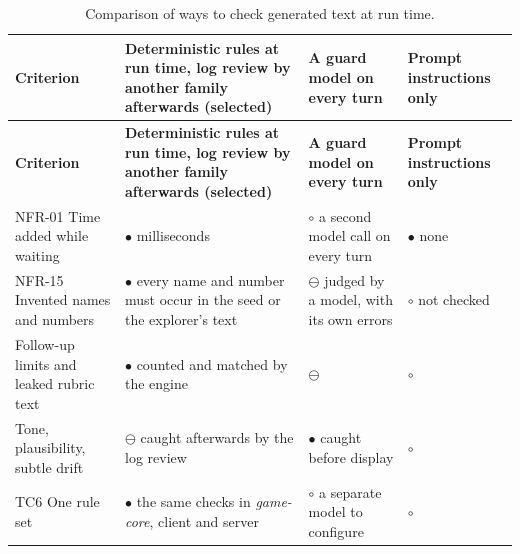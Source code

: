 {\small
\begin{longtable}{|>{\raggedright\arraybackslash}p{}|>{\raggedright\arraybackslash}p{}|>{\raggedright\arraybackslash}p{}|>{\raggedright\arraybackslash}p{}|}
\caption{Comparison of ways to check generated text at run time.} \\
\hline
\textbf{Criterion} & \textbf{Deterministic rules at run time, log review by another family afterwards (selected)} & \textbf{A guard model on every turn\cite{r199}} & \textbf{Prompt instructions only} \\ \hline
\endfirsthead
\hline
\textbf{Criterion} & \textbf{Deterministic rules at run time, log review by another family afterwards (selected)} & \textbf{A guard model on every turn\cite{r199}} & \textbf{Prompt instructions only} \\ \hline
\endhead
NFR-01 Time added while waiting & $\bullet$ milliseconds & $\circ$ a second model call on every turn & $\bullet$ none \\ \hline
NFR-15 Invented names and numbers & $\bullet$ every name and number must occur in the seed or the explorer's text & $\ominus$ judged by a model, with its own errors & $\circ$ not checked \\ \hline
Follow-up limits and leaked rubric text & $\bullet$ counted and matched by the engine & $\ominus$ & $\circ$ \\ \hline
Tone, plausibility, subtle drift & $\ominus$ caught afterwards by the log review & $\bullet$ caught before display & $\circ$ \\ \hline
TC6 One rule set & $\bullet$ the same checks in \textit{game-\allowbreak{}core}, client and server & $\circ$ a separate model to configure & $\circ$ \\ \hline
\end{longtable}
}

